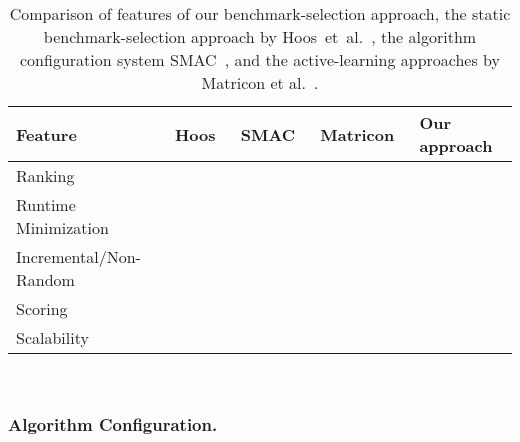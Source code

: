 \documentclass[runningheads]{llncs}
\newcommand{\cmark}{\ding{51}} %
\newcommand{\xmark}{\ding{55}}
\begin{document}
\begin{table}[tbp]
  \centering
  \begin{tabular}{
    m{}
    >{\centering\arraybackslash}m{}
    >{\centering\arraybackslash}m{}
    >{\centering\arraybackslash}m{}
    >{\centering\arraybackslash}m{}
  }
    \hline
    Feature & Hoos~\cite{HoosKSS13} & SMAC~\cite{HutterHL11} & Matricon~\cite{MatriconAFSH21} & Our approach \\
    \hline
    Ranking & \cmark & \xmark & \cmark & \cmark \\
    Runtime Minimization & \xmark & \cmark & \cmark & \cmark \\
    Incremental/Non-Random & \xmark & \xmark & \cmark & \cmark \\
    Scoring & \cmark & \xmark & \xmark & \cmark \\
    Scalability & \cmark & \cmark & \xmark & \cmark \\
    \hline
  \end{tabular}
  ~\\[1em]
  \caption{Comparison of features of our benchmark-selection approach, the static benchmark-selection approach by Hoos~et~al.~\cite{HoosKSS13}, the algorithm configuration system SMAC~\cite{HutterHL11}, and the active-learning approaches by Matricon et al.~\cite{MatriconAFSH21}.
  }
  \label{tab:requirements}
\end{table}

\subsubsection{Algorithm Configuration.}
\end{document}
